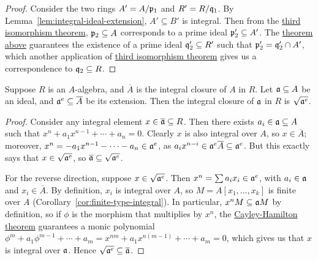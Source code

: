 \begin{proof}
    Consider the two rings \(A' = A/\mathfrak{p}_1\) and \(R' = R/\mathfrak{q}_1\).
    By Lemma~\ref{lem:integral-ideal-extension}, \(A' \subseteq B'\) is integral.
    Then from the \hyperref[thm:iso-3-ring]{third isomorphism theorem},
    \(\mathfrak{p}_2 \subseteq A\) corresponds to a prime ideal \(\mathfrak{p}_2' \subseteq A'\).
    The \hyperref[thm:integral-prime-ideal]{theorem above} guarantees
    the existence of a prime ideal \(\mathfrak{q}_2' \subseteq R'\)
    such that \(\mathfrak{p}_2' = \mathfrak{q}_2' \cap A'\),
    which another application of \hyperref[thm:iso-3-ring]{third isomorphism theorem}
    gives us a correspondence to \(\mathfrak{q}_2 \subseteq R\).
\end{proof}

\begin{lemma}\label{lem:ideal-integral-closure}
    Suppose \(R\) is an \(A\)-algebra, and \(\overline{A}\) is the integral closure of \(A\) in \(R\).
    Let \(\mathfrak{a} \subseteq A\) be an ideal, and \(\mathfrak{a}^e \subseteq \overline{A}\) be its extension.
    Then the integral closure of \(\mathfrak{a}\) in \(R\) is \(\sqrt{\mathfrak{a}^e}\).
\end{lemma}
\begin{proof}
    Consider any integral element \(x \in \overline{\mathfrak{a}} \subseteq R\).
    Then there exists \(a_i \in \mathfrak{a} \subseteq A\) such that
    \(x^n + a_1 x^{n-1} + \cdots + a_n = 0\).
    Clearly \(x\) is also integral over \(A\), so \(x \in \overline{A}\);
    moreover, \(x^n = - a_1 x^{n-1} - \cdots - a_n \in \mathfrak{a}^e\),
    as \(a_i x^{n-i} \in \mathfrak{a}^e\overline{A} \subseteq \mathfrak{a}^e\).
    But this exactly says that \(x \in \sqrt{\mathfrak{a}^e}\),
    so \(\overline{\mathfrak{a}} \subseteq \sqrt{\mathfrak{a}^e}\).

    For the reverse direction, suppose \(x \in \sqrt{\mathfrak{a}^e}\).
    Then \(x^n = \sum a_i x_i \in \mathfrak{a}^e\), with \(a_i \in \mathfrak{a}\) and \(x_i \in \overline{A}\).
    By definition, \(x_i\) is integral over \(A\),
    so \(M = A[x_1,\hdots,x_k]\) is finite over \(A\) (Corollary~\ref{cor:finite-type-integral}).
    In particular, \(x^n M \subseteq \mathfrak{a}M\) by definition,
    so if \(\phi\) is the morphism that multiplies by \(x^n\),
    the \hyperref[lem:cayley-hamilton]{Cayley-Hamilton theorem} guarantees a monic polynomial
    \(\phi^m + a_1\phi^{m-1} + \cdots + a_m = x^{nm} + a_1 x^{n(m-1)} + \cdots + a_m = 0\),
    which gives us that \(x\) is integral over \(\mathfrak{a}\).
    Hence \(\sqrt{\mathfrak{a}^e} \subseteq \overline{\mathfrak{a}}\).
\end{proof}
